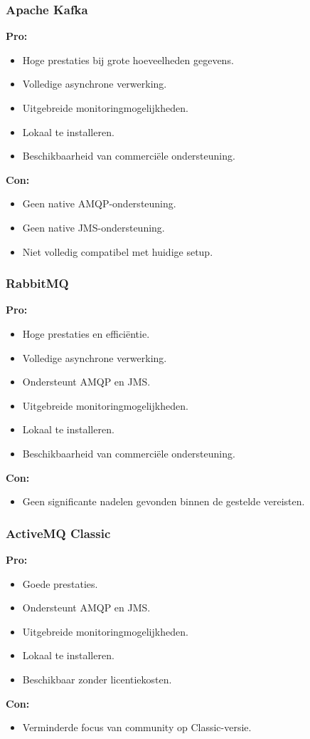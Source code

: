 \subsubsection{Apache Kafka}
\textbf{Pro:}
\begin{itemize}
    \item Hoge prestaties bij grote hoeveelheden gegevens.
    \item Volledige asynchrone verwerking.
    \item Uitgebreide monitoringmogelijkheden.
    \item Lokaal te installeren.
    \item Beschikbaarheid van commerciële ondersteuning.
\end{itemize}
\textbf{Con:}
\begin{itemize}
    \item Geen native AMQP-ondersteuning.
    \item Geen native JMS-ondersteuning.
    \item Niet volledig compatibel met huidige setup.
\end{itemize}

\subsubsection{RabbitMQ}
\textbf{Pro:}
\begin{itemize}
    \item Hoge prestaties en efficiëntie.
    \item Volledige asynchrone verwerking.
    \item Ondersteunt AMQP en JMS.
    \item Uitgebreide monitoringmogelijkheden.
    \item Lokaal te installeren.
    \item Beschikbaarheid van commerciële ondersteuning.
\end{itemize}
\textbf{Con:}
\begin{itemize}
    \item Geen significante nadelen gevonden binnen de gestelde vereisten.
\end{itemize}

\subsubsection{ActiveMQ Classic}
\textbf{Pro:}
\begin{itemize}
    \item Goede prestaties.
    \item Ondersteunt AMQP en JMS.
    \item Uitgebreide monitoringmogelijkheden.
    \item Lokaal te installeren.
    \item Beschikbaar zonder licentiekosten.
\end{itemize}
\textbf{Con:}
\begin{itemize}
    \item Verminderde focus van community op Classic-versie.
\end{itemize}

